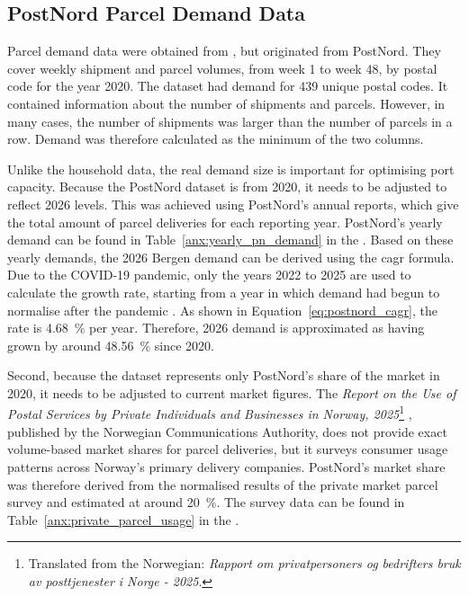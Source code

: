 \documentclass[12pt]{article}
\begin{document}
\subsection{PostNord Parcel Demand Data}
\label{subsec:postnord-parcel-demand-data}

Parcel demand data were obtained from \cite{household}, but originated from PostNord. They cover weekly shipment and parcel volumes, from week \num{1} to week \num{48}, by postal code for the year 2020. The dataset had demand for \num{439} unique postal codes. It contained information about the number of shipments and parcels. However, in many cases, the number of shipments was larger than the number of parcels in a row. Demand was therefore calculated as the minimum of the two columns.

Unlike the household data, the real demand size is important for optimising port capacity. Because the PostNord dataset is from 2020, it needs to be adjusted to reflect 2026 levels. This was achieved using PostNord's annual reports, which give the total amount of parcel deliveries for each reporting year. PostNord's yearly demand can be found in Table~\ref{anx:yearly_pn_demand} in the . Based on these yearly demands, the 2026 Bergen demand can be derived using the \ac{cagr} formula. Due to the COVID-19 pandemic, only the years 2022 to 2025 are used to calculate the growth rate, starting from a year in which demand had begun to normalise after the pandemic \parencite{pitney_bowes_index_2023}. As shown in Equation~\ref{eq:postnord_cagr}, the rate is \qty{4.68}{\percent} per year. Therefore, 2026 demand is approximated as having grown by around \qty{48.56}{\percent} since 2020.

Second, because the dataset represents only PostNord's share of the market in 2020, it needs to be adjusted to current market figures. The \textit{Report on the Use of Postal Services by Private Individuals and Businesses in Norway, 2025}\footnote{Translated from the Norwegian: \textit{Rapport om privatpersoners og bedrifters bruk av posttjenester i Norge - 2025}.} \parencite{nkom_post_2025}, published by the Norwegian Communications Authority, does not provide exact volume-based market shares for parcel deliveries, but it surveys consumer usage patterns across Norway's primary delivery companies. PostNord's market share was therefore derived from the normalised results of the private market parcel survey and estimated at around \qty{20}{\percent}. The survey data can be found in Table~\ref{anx:private_parcel_usage} in the .
\end{document}

